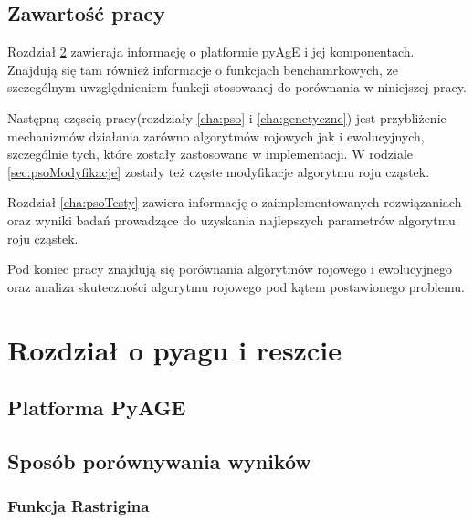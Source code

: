 \section{Zawartość pracy}
Rozdział \ref{cha:pyage} zawieraja informację o platformie pyAgE i jej komponentach. Znajdują się tam również informacje o funkcjach benchamrkowych, ze szczególnym uwzględnieniem funkcji stosowanej do porównania w niniejszej pracy.

Następną częscią pracy(rozdziały \ref{cha:pso} i \ref{cha:genetyczne}) jest przybliżenie mechanizmów działania zarówno algorytmów rojowych jak i ewolucyjnych, szczególnie tych, które zostały zastosowane w implementacji. W rodziale \ref{sec:psoModyfikacje} zostały też częste modyfikacje algorytmu roju cząstek.

Rozdział \ref{cha:psoTesty} zawiera informację o zaimplementowanych rozwiązaniach oraz wyniki badań prowadzące do uzyskania najlepszych parametrów algorytmu roju cząstek.

Pod koniec pracy znajdują się porównania algorytmów rojowego i ewolucyjnego oraz analiza skuteczności algorytmu rojowego pod kątem postawionego problemu.


\chapter{Rozdział o pyagu i reszcie}
\label{cha:pyage}

\section{Platforma PyAGE}



\section{Sposób porównywania wyników}
\label{sec:porownywanieWynikow}





\subsection{Funkcja Rastrigina}
\label{sec:rastrigin}















